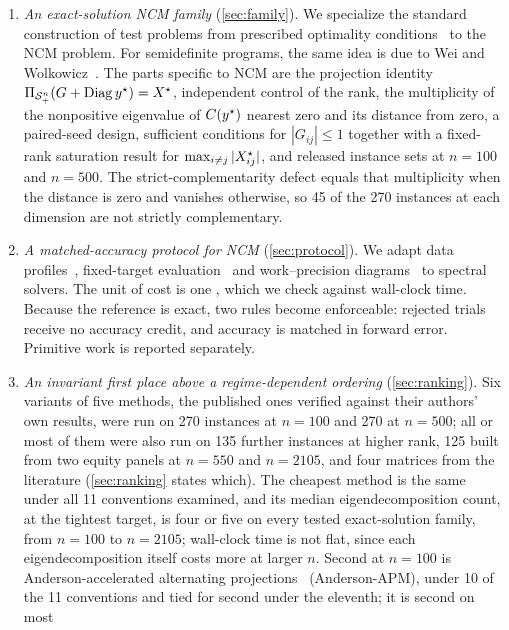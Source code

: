 \begin{enumerate}
  \item \emph{An exact-solution NCM family} (\cref{sec:family}). We specialize
    the standard construction of test problems from prescribed optimality
    conditions~\cite{lenard1984randomly,calamai1993new} to the NCM problem.
    For semidefinite programs, the same idea is due to Wei and
    Wolkowicz~\cite{wei2010generating}. The parts specific to NCM are the
    projection identity $\Pi_{\mathcal{S}_+^n}(G+\operatorname{Diag}y^\star)=X^\star$, independent control of the
    rank, the multiplicity of the nonpositive eigenvalue of $C(y^\star)$ nearest
    zero and its distance from zero, a paired-seed design, sufficient conditions for
    $|G_{ij}|\le1$ together with a fixed-rank saturation result for
    $\max_{i\ne j}|X^\star_{ij}|$, and released instance sets at $n=100$ and
    $n=500$. The strict-complementarity defect equals that multiplicity when
    the distance is zero and vanishes otherwise, so 45 of the 270 instances at
    each dimension are not strictly complementary.
  \item \emph{A matched-accuracy protocol for NCM} (\cref{sec:protocol}). We
    adapt data profiles~\cite{more2009benchmarking}, fixed-target
    evaluation~\cite{hansen2021coco} and work--precision
    diagrams~\cite{hairer1996solving} to spectral solvers. The unit of cost is
    one \EVD, which we check against wall-clock time. Because the reference is
    exact, two rules become enforceable: rejected trials receive no accuracy
    credit, and accuracy is matched in forward error. Primitive work is
    reported separately.
  \item \emph{An invariant first place above a regime-dependent ordering}
    (\cref{sec:ranking}). Six variants of five methods, the published ones
    verified against their authors' own results, were run on 270 instances
    at $n=100$ and 270 at $n=500$; all or most of them were also run on 135
    further instances at higher rank, 125 built from two equity panels at
    $n=550$ and $n=2105$, and four matrices from the literature
    (\cref{sec:ranking} states which). The cheapest method is the same under
    all 11 conventions examined, and its median eigendecomposition count,
    at the tightest target, is four or five on every tested exact-solution
    family, from $n=100$ to $n=2105$; wall-clock time is not flat, since
    each eigendecomposition itself costs more at larger $n$. Second at
    $n=100$ is Anderson-accelerated alternating
    projections~\cite{higham2016anderson} (Anderson-APM), under 10 of the 11
    conventions and tied for second under the eleventh; it is second on most

\end{enumerate}
